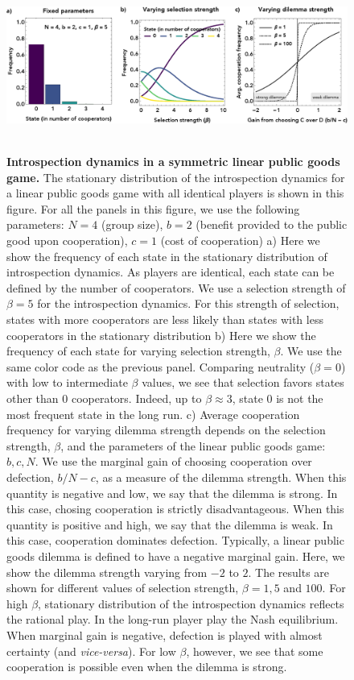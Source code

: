 \documentclass[11pt]{article}
\theoremstyle{plainCl1}
\theoremstyle{plainCl2}
\begin{document}
\begin{figure}
\centering
\includegraphics[width =  \textwidth]{figures/figure1.eps}~\\[0.4cm]
\caption{\onehalfspacing
\textbf{Introspection dynamics in a symmetric linear public goods game.}
The stationary distribution of the introspection dynamics for a linear public goods game with all identical players is shown in this figure. For all the panels in this figure, we use the following parameters: $N = 4$ (group size), $b = 2$ (benefit provided to the public good upon cooperation), $c = 1$ (cost of cooperation) a) Here we show the frequency of each state in the stationary distribution of introspection dynamics. As players are identical, each state can be defined by the number of cooperators. We use a selection strength of $\beta = 5$ for the introspection dynamics. For this strength of selection, states with more cooperators are less likely than states with less cooperators in the stationary distribution b) Here we show the frequency of each state for varying selection strength, $\beta$. We use the same color code as the previous panel. Comparing neutrality ($\beta = 0$) with low to intermediate $\beta$ values, we see that selection favors states other than 0 cooperators. Indeed, up to $\beta \approx 3$, state $0$ is not the most frequent state in the long run. c) Average cooperation frequency for varying dilemma strength depends on the selection strength, $\beta$, and the parameters of the linear public goods game: $b,c, N$. We use the marginal gain of choosing cooperation over defection, $b/N - c$, as a measure of the dilemma strength. When this quantity is negative and low, we say that the dilemma is strong. In this case, chosing cooperation is strictly disadvantageous. When this quantity is positive and high, we say that the dilemma is weak. In this case, cooperation dominates defection. Typically, a linear public goods dilemma is defined to have a negative marginal gain. Here, we show the dilemma strength varying from $-2$ to $2$. The results are shown for different values of selection strength, $\beta = 1, 5$ and $100$. For high $\beta$, stationary distribution of the introspection dynamics reflects the rational play. In the long-run player play the Nash equilibrium. When marginal gain is negative, defection is played with almost certainty (and \emph{vice-versa}). For low $\beta$, however, we see that some cooperation is possible even when the dilemma is strong. }
\label{Fig:LPGG-symmetric}
\end{figure}
\end{document}
